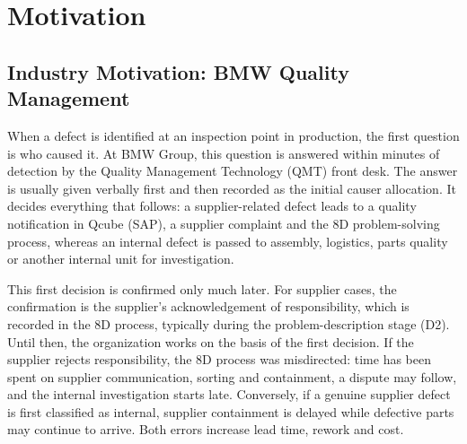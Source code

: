 \section{Motivation}\label{sec:intro_motivation}

\subsection{Industry Motivation: BMW Quality Management}\label{sec:intro_motivation_bmw}


When a defect is identified at an inspection point in production, the first
question is who caused it. At BMW Group, this question is answered within
minutes of detection by the Quality Management Technology (QMT) front desk.
The answer is usually given verbally first and then recorded as the initial
causer allocation. It decides everything that follows: a supplier-related
defect leads to a quality notification in Qcube (SAP), a supplier complaint
and the 8D problem-solving process, whereas an internal defect is passed to
assembly, logistics, parts quality or another internal unit for
investigation.

This first decision is confirmed only much later. For supplier cases, the
confirmation is the supplier's acknowledgement of responsibility, which is
recorded in the 8D process, typically during the problem-description stage
(D2). Until then, the organization works on the basis of the first decision.
If the supplier rejects responsibility, the 8D process was misdirected: time
has been spent on supplier communication, sorting and containment, a dispute
may follow, and the internal investigation starts late. Conversely, if a
genuine supplier defect is first classified as internal, supplier containment
is delayed while defective parts may continue to arrive. Both errors increase
lead time, rework and cost.

